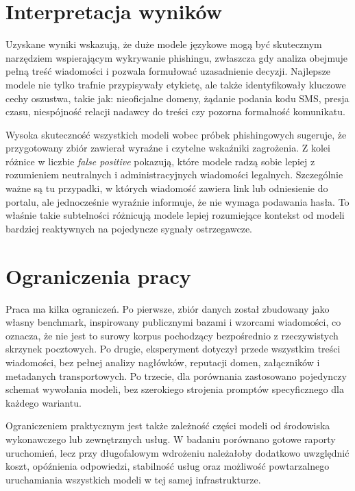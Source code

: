 \documentclass[12pt,a4paper,openright]{report}
\begin{document}
\section{Interpretacja wyników}

Uzyskane wyniki wskazują, że duże modele językowe mogą być skutecznym narzędziem wspierającym wykrywanie phishingu, zwłaszcza gdy analiza obejmuje pełną treść wiadomości i pozwala formułować uzasadnienie decyzji. Najlepsze modele nie tylko trafnie przypisywały etykietę, ale także identyfikowały kluczowe cechy oszustwa, takie jak: nieoficjalne domeny, żądanie podania kodu SMS, presja czasu, niespójność relacji nadawcy do treści czy pozorna formalność komunikatu.

Wysoka skuteczność wszystkich modeli wobec próbek phishingowych sugeruje, że przygotowany zbiór zawierał wyraźne i czytelne wskaźniki zagrożenia. Z kolei różnice w liczbie \textit{false positive} pokazują, które modele radzą sobie lepiej z rozumieniem neutralnych i administracyjnych wiadomości legalnych. Szczególnie ważne są tu przypadki, w których wiadomość zawiera link lub odniesienie do portalu, ale jednocześnie wyraźnie informuje, że nie wymaga podawania hasła. To właśnie takie subtelności różnicują modele lepiej rozumiejące kontekst od modeli bardziej reaktywnych na pojedyncze sygnały ostrzegawcze.

\section{Ograniczenia pracy}

Praca ma kilka ograniczeń. Po pierwsze, zbiór danych został zbudowany jako własny benchmark, inspirowany publicznymi bazami i wzorcami wiadomości, co oznacza, że nie jest to surowy korpus pochodzący bezpośrednio z rzeczywistych skrzynek pocztowych. Po drugie, eksperyment dotyczył przede wszystkim treści wiadomości, bez pełnej analizy nagłówków, reputacji domen, załączników i metadanych transportowych. Po trzecie, dla porównania zastosowano pojedynczy schemat wywołania modeli, bez szerokiego strojenia promptów specyficznego dla każdego wariantu.

Ograniczeniem praktycznym jest także zależność części modeli od środowiska wykonawczego lub zewnętrznych usług. W badaniu porównano gotowe raporty uruchomień, lecz przy długofalowym wdrożeniu należałoby dodatkowo uwzględnić koszt, opóźnienia odpowiedzi, stabilność usług oraz możliwość powtarzalnego uruchamiania wszystkich modeli w tej samej infrastrukturze.
\end{document}
